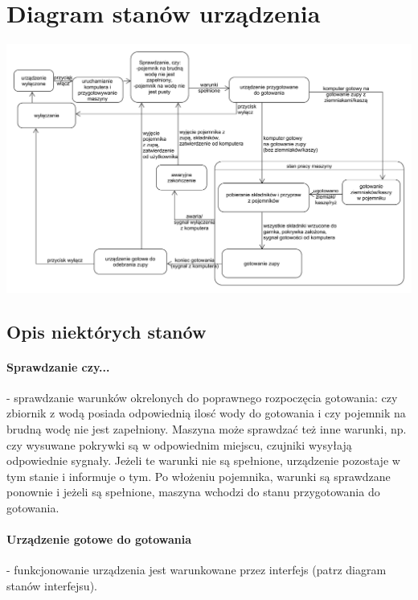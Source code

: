 \documentclass[12pt,a4paper,notitlepage]{article}
\begin{document}
\section{Diagram stanów urządzenia}

\includegraphics[scale=0.16,width=\textwidth,height=\textheight,keepaspectratio=true]{Diagram-stanow-urzadzenie.pdf}

\subsection{Opis niektórych stanów}
\paragraph{Sprawdzanie czy...} - sprawdzanie warunków okrelonych do poprawnego rozpoczęcia gotowania: czy zbiornik z wodą posiada odpowiednią ilosć wody do gotowania i czy pojemnik na brudną wodę nie jest zapełniony. Maszyna może sprawdzać też inne warunki, np. czy wysuwane pokrywki są w odpowiednim miejscu, czujniki wysyłają odpowiednie sygnały. Jeżeli te warunki nie są spełnione, urządzenie pozostaje w tym stanie i informuje o tym. Po włożeniu pojemnika, warunki są sprawdzane ponownie i jeżeli są spełnione, maszyna wchodzi do stanu przygotowania do gotowania.
\paragraph{Urządzenie gotowe do gotowania} - funkcjonowanie urządzenia jest warunkowane przez interfejs (patrz diagram stanów interfejsu).
\end{document}

